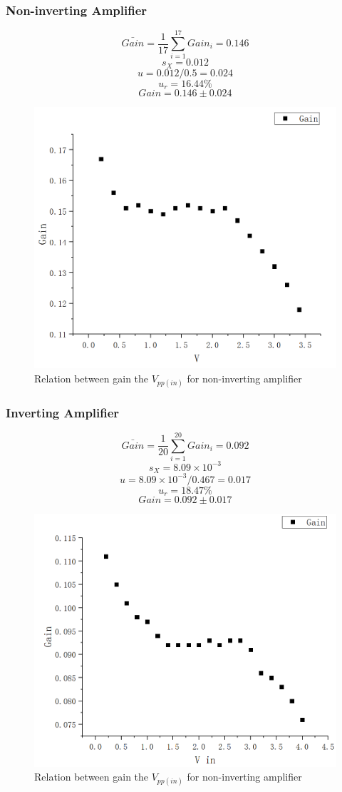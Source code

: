 \documentclass[12pt]{article}
\begin{document}
\subsubsection{Non-inverting Amplifier}
$$\bar{Gain}=\frac{1}{17}\sum^{17}_{i=1}Gain_i=0.146$$
$$s_X=0.012$$
$$u=0.012/0.5=0.024$$
$$u_r=16.44\%$$
$$Gain=0.146\pm0.024$$
\begin{figure}[H]
\centering
\includegraphics[scale=0.3]{P9.jpg}
\caption{Relation between gain the $V_{pp(in)}$ for non-inverting amplifier}
\end{figure}
\subsubsection{Inverting Amplifier}
$$\bar{Gain}=\frac{1}{20}\sum^{20}_{i=1}Gain_i=0.092$$
$$s_X=8.09\times10^{-3}$$
$$u=8.09\times10^{-3}/0.467=0.017$$
$$u_r=18.47\%$$
$$Gain=0.092\pm0.017$$
\begin{figure}[H]
\centering
\includegraphics[scale=0.4]{P10.jpg}
\caption{Relation between gain the $V_{pp(in)}$ for non-inverting amplifier}
\end{figure}
\end{document}
